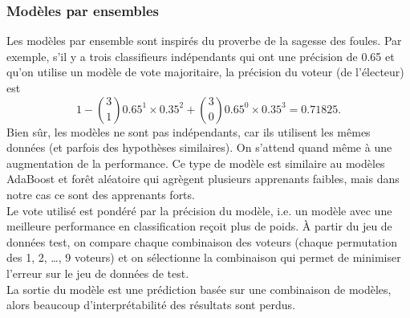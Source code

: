 \subsubsection{Modèles par ensembles}

Les modèles par ensemble sont inspirés du proverbe de la sagesse des foules. Par exemple, s'il y a trois classifieurs indépendants qui ont une précision de 0.65 et qu'on utilise un modèle de vote majoritaire, la précision du voteur (de l'électeur) est 
$$1 - \binom{3}{1}0.65^1\times 0.35^2 + \binom{3}{0}0.65^0\times 0.35^3 = 0.71825.$$
Bien sûr, les modèles ne sont pas indépendants, car ils utilisent les mêmes données (et parfois des hypothèses similaires). On s'attend quand même à une augmentation de la performance. Ce type de modèle est similaire au modèles AdaBoost et forêt aléatoire qui agrègent plusieurs apprenants faibles, mais dans notre cas ce sont des apprenants forts.\\

Le vote utilisé est pondéré par la précision du modèle, i.e. un modèle avec une meilleure performance en classification reçoit plus de poids. À partir du jeu de données test, on compare chaque combinaison des voteurs (chaque permutation des 1, 2, \dots, 9 voteurs) et on sélectionne la combinaison qui permet de minimiser l'erreur sur le jeu de données de test.\\

La sortie du modèle est une prédiction basée sur une combinaison de modèles, alors beaucoup d'interprétabilité des résultats sont perdus.
